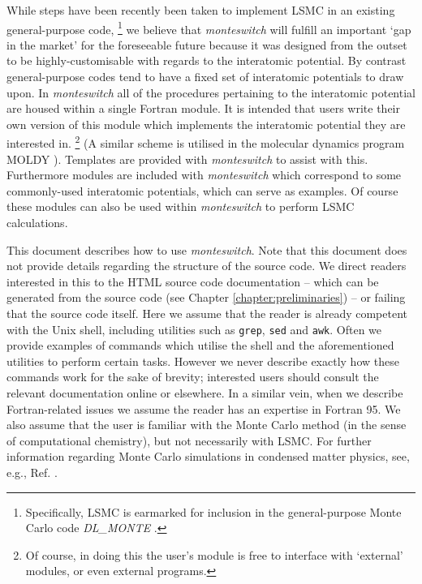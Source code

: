 \documentclass{report}
\begin{document}
While steps have been recently been taken to implement LSMC in an existing general-purpose code,
\footnote{Specifically, LSMC is earmarked for inclusion in the general-purpose Monte Carlo code \emph{DL\_MONTE} \cite{Purton_2013}.}
we believe that \emph{monteswitch} will fulfill an important `gap in the market' for the foreseeable future because it was designed from 
the outset to be highly-customisable with regards to the interatomic potential. By contrast general-purpose codes tend to have a fixed set 
of interatomic potentials to draw upon.
In \emph{monteswitch} all of the procedures pertaining to the interatomic potential are housed within a single Fortran module. 
It is intended that users write their own version of this module which implements the interatomic potential they are 
interested in.
\footnote{Of course, in doing this the user's module is free to interface with `external' modules, or even external programs.}
(A similar scheme is utilised in the molecular dynamics program MOLDY \cite{Ackland_2011}). 
Templates are provided with \emph{monteswitch} to assist with this. Furthermore modules are included
with \emph{monteswitch} which correspond to some commonly-used interatomic potentials, which can serve as examples. Of course these modules can also be
used within \emph{monteswitch} to perform LSMC calculations.

This document describes how to use \emph{monteswitch}. Note that this document does not provide details regarding the structure of the source code. 
We direct readers interested in this to the HTML source code documentation -- which can be generated from the source code (see Chapter
\ref{chapter:preliminaries}) -- or failing that the source code itself. Here we assume that the reader is already competent with the Unix shell, 
including utilities such as \texttt{grep}, \texttt{sed} and \texttt{awk}. Often we provide examples of commands which utilise the shell and the 
aforementioned utilities to perform certain tasks. However we never describe exactly how these commands work for the sake of brevity; interested users
should consult the relevant documentation online or elsewhere. In a similar vein, when we describe Fortran-related issues we assume the reader has 
an expertise in Fortran 95. We also assume that the user is familiar with the Monte Carlo method (in the sense of computational
chemistry), but not necessarily with LSMC. For further information regarding Monte Carlo simulations in condensed 
matter physics, see, e.g., Ref. \cite{book:Frenkel}. 
\end{document}
